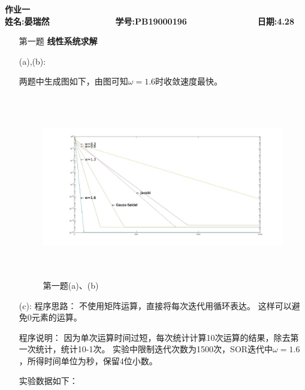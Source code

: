 \documentclass[12pt,a4paper,utf8]{ctexart}
\begin{document}


\begin{center}
\textbf{作业一}\\
\textbf{姓名:晏瑞然~~~~~~~~~~~~~ 学号:PB19000196~~~~~~~~~~~~~~ 日期:4.28}\\
\end{center}

\begin{center}
\fbox{
\begin{minipage}{40em}
\vspace{5cm}
\hspace{20cm}
\end{minipage}}
\end{center}
\vspace{1cm}

\begin{enumerate}
\item[第一题] \textbf{线性系统求解}  

(a),(b):

两题中生成图如下，由图可知$\omega=1.6$时收敛速度最快。

\begin{figure}[h]
   \centering
   \includegraphics[width=15cm,height=8cm]{ex1_2.jpg}
   \caption{第一题(a)、(b)}
\end{figure}

(c):
程序思路：
不使用矩阵运算，直接将每次迭代用循环表达。
这样可以避免0元素的运算。

程序说明：
因为单次运算时间过短，每次统计计算10次运算的结果，除去第一次统计，统计10-1次。
实验中限制迭代次数为1500次，SOR迭代中$\omega=1.6$，所得时间单位为秒，保留4位小数。

实验数据如下：

\begin{table}[h]


\end{table}
\end{enumerate}
\end{document}
